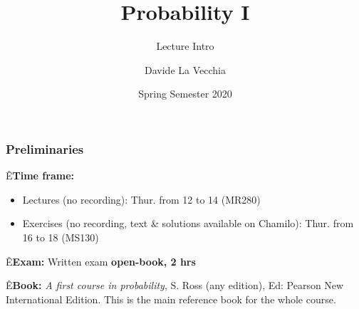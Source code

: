 \documentclass[notes=show,handout]{beamer}
\begin{document}
\title[S110015]{Probability I}
\subtitle{Lecture Intro}
\author[La Vecchia]{Davide La Vecchia}
\date{Spring Semester 2020}
\maketitle



\begin{frame}
\frametitle{Preliminaries}

\color{red}Ê\textbf{Time frame:} \color{black}

\vspace{0.2cm}

\begin{itemize}
\item Lectures (no recording): Thur. from 12 to 14 (MR280) \vspace{0.5cm}

\item Exercises (no recording, text \& solutions available on Chamilo):  Thur. from 16 to 18 (MS130) 
  
\end{itemize}

\vspace{0.85cm}

\color{red}Ê\textbf{Exam:} \color{black} Written exam \textbf{open-book, 2 hrs}

\vspace{0.85cm}

\color{red}Ê\textbf{Book:} \color{black} \textit{A first course in probability}, S. Ross (any edition), Ed: Pearson New International Edition. This is the main reference book for the whole course.


\end{frame}
\end{document}
